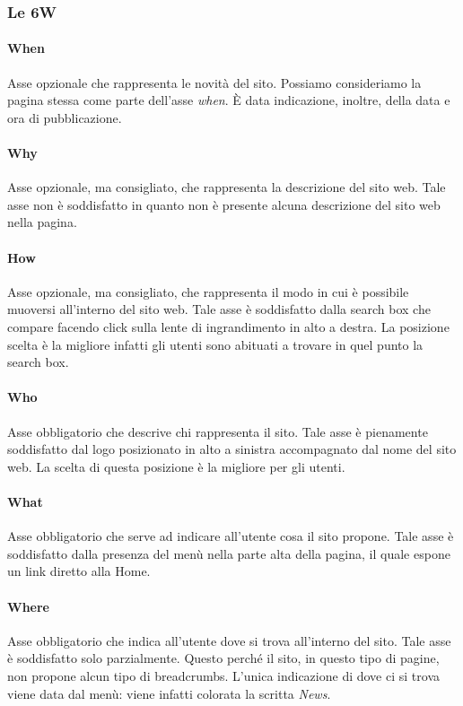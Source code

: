 \documentclass[../ProgettoTecWeb2.tex]{subfiles}
\begin{document}
		\subsubsection{Le 6W}
			\paragraph{When}
			Asse opzionale che rappresenta le novità del sito. Possiamo consideriamo la pagina stessa come parte dell'asse \textit{when}. È data indicazione, inoltre, della data e ora di pubblicazione.

			\paragraph{Why}
			Asse opzionale, ma consigliato, che rappresenta la descrizione del sito web. Tale asse non è soddisfatto in quanto non è presente alcuna descrizione del sito web nella pagina.

			\paragraph{How}
			Asse opzionale, ma consigliato, che rappresenta il modo in cui è possibile muoversi all'interno del sito web. Tale asse è soddisfatto dalla search box che compare facendo click sulla lente di ingrandimento in alto a destra. La posizione scelta è la migliore infatti gli utenti sono abituati a trovare in quel punto la search box. 
			
			\paragraph{Who}
			Asse obbligatorio che descrive chi rappresenta il sito. Tale asse è pienamente soddisfatto dal logo posizionato in alto a sinistra accompagnato dal nome del sito web. La scelta di questa posizione è la migliore per gli utenti.

			\paragraph{What}
			Asse obbligatorio che serve ad indicare all'utente cosa il sito propone. Tale asse è soddisfatto dalla presenza del menù nella parte alta della pagina, il quale espone un link diretto alla Home.

			\paragraph{Where}
			Asse obbligatorio che indica all'utente dove si trova all'interno del sito. Tale asse è soddisfatto solo parzialmente. Questo perché il sito, in questo tipo di pagine, non propone alcun tipo di breadcrumbs. L'unica indicazione di dove ci si trova viene data dal menù: viene infatti colorata la scritta \textit{News}.
\end{document}
